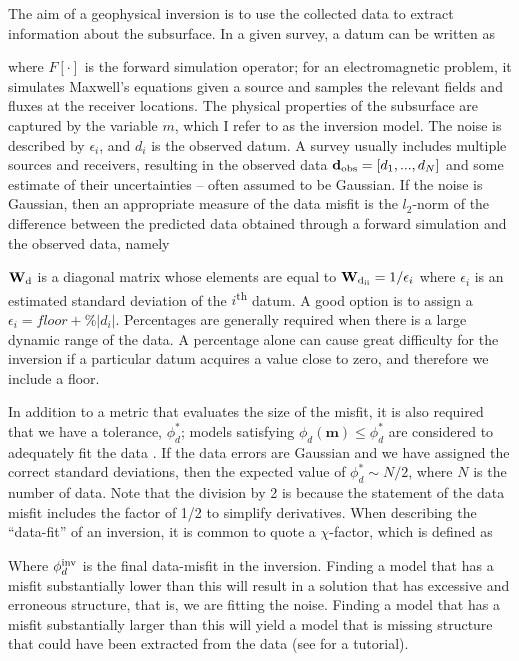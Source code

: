 The aim of a geophysical inversion is to use the collected data to extract information about the subsurface. In a given survey, a datum can be written as

where $F[\cdot]$ is the forward simulation operator; for an electromagnetic problem, it simulates Maxwell's equations given a source and samples the relevant fields and fluxes at the receiver locations. The physical properties of the subsurface are captured by the variable $m$, which I refer to as the inversion model. The noise is described by $\epsilon_i$, and $d_i$ is the observed datum. A survey usually includes multiple sources and receivers, resulting in the observed data $\mathbf{d}_{\rm obs} = [d_1, ... , d_N]$ and some estimate of their uncertainties -- often assumed to be Gaussian. If the noise is Gaussian, then an appropriate measure of the data misfit is the $l_2$-norm of the difference between the predicted data obtained through a forward simulation and the observed data, namely

$\mathbf{W}_{\rm d}$ is a diagonal matrix whose elements are equal to $\mathbf{W}_{\rm d_{ii}}=1/\epsilon_i$ where $\epsilon_i$ is an estimated standard deviation of the $i$\textsuperscript{th} datum. A good option is to assign a $\epsilon_i = floor + \%|d_i|$.
Percentages are generally required when there is a large dynamic range of the data. A percentage alone can cause great difficulty for the inversion if a particular datum acquires a value close to zero, and therefore we include a floor.

In addition to a metric that evaluates the size of the misfit, it is also required that we have a tolerance, $\phi_d^*$; models satisfying $\phi_d(\mathbf{m}) \leq \phi_d^*$ are considered to adequately fit the data \citep{Parker1994}. If the data errors are Gaussian and we have assigned the correct standard deviations, then the expected value of $\phi_d^* \sim N/2$, where $N$ is the number of data. Note that the division by 2 is because the statement of the data misfit includes the factor of 1/2 to simplify derivatives. When describing the ``data-fit'' of an inversion, it is common to quote a $\chi$-factor, which is defined as

Where $\phi_d^{\rm inv}$ is the final data-misfit in the inversion.  Finding a model that has a misfit substantially lower than this will result in a solution that has excessive and erroneous structure, that is, we are fitting the noise. Finding a model that has a misfit substantially larger than this will yield a model that is missing structure that could have been extracted from the data (see \cite{Oldenburg2005} for a tutorial).

